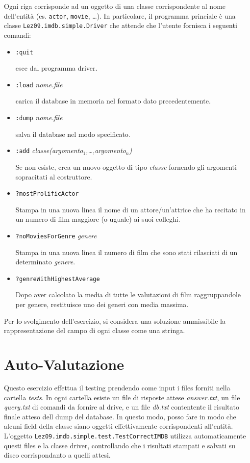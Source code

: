 \documentclass[]{scrartcl}
\begin{document}
Ogni riga corrisponde ad un oggetto di una classe corrispondente al nome dell'entità (es. \texttt{actor}, \texttt{movie}, \dots). In particolare, il programma princiale è una classe \texttt{Lez09.imdb.simple.Driver} che attende che l'utente fornisca i seguenti comandi:
\begin{itemize}
\item \texttt{:quit}

esce dal programma driver.	
	
\item \texttt{:load} \textit{nome.file}

carica il database in memoria nel formato dato precedentemente.



\item \texttt{:dump} \textit{nome.file}

salva il database nel modo specificato.

\item \texttt{:add} \textit{classe(argomento$_1$,\dots,argomento$_n$)}

Se non esiste, crea un nuovo oggetto di tipo \textit{classe} fornendo gli argomenti sopracitati al costruttore.

\item \texttt{?mostProlificActor}

Stampa in una nuova linea il nome di un attore/un'attrice che ha recitato in un numero di film maggiore (o uguale) ai suoi colleghi.


\item \texttt{?noMoviesForGenre} \textit{genere}

Stampa in una nuova linea il numero di film che sono stati rilasciati di un determinato \textit{genere}.

\item \texttt{?genreWithHighestAverage}

Dopo aver calcolato la media di tutte le valutazioni di film raggruppandole per genere, restituisce uno dei generi con media massima.
\end{itemize}

Per lo svolgimento dell'esercizio, si considera una soluzione ammissibile la rappresentazione del campo di ogni classe come una stringa.

\section*{Auto-Valutazione}

Questo esercizio effettua il testing prendendo come input i files forniti nella cartella \textit{tests}. In ogni cartella esiste un file di risposte attese \textit{answer.txt}, un file \textit{query.txt} di comandi da fornire al drive, e un file \textit{db.txt} contentente il risultato finale atteso dell dump del database. In questo modo, posso fare in modo che alcuni field della classe siano oggetti effettivamente corrispondenti all'entità. L'oggetto \texttt{Lez09.imdb.simple.test.TestCorrectIMDB} utilizza automaticamente questi files e la classe driver, controllando che i risultati stampati e salvati su disco corrispondanto a quelli attesi.
\end{document}
